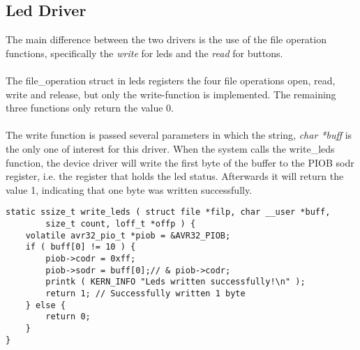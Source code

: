 \subsection{Led Driver}
The main difference between the two drivers is the use of the file operation
functions, specifically the \textit{write} for leds and the \textit{read} for
buttons.\\
\\
The file\_operation struct in leds registers the four file operations open,
read, write and release, but only the write-function is implemented.
The remaining three functions only return the value 0.\\
\\
The write function is passed several parameters in which the string,
\textit{char *buff} is the only one of interest for this driver.
When the system calls the write\_leds function, the device driver will 
write the first byte of the buffer to the PIOB sodr register, i.e. the register
that holds the led status. Afterwards it will return the value 1, indicating that
one byte was written successfully.
\\
\begin{lstlisting}
static ssize_t write_leds ( struct file *filp, char __user *buff, 
		size_t count, loff_t *offp ) {
	volatile avr32_pio_t *piob = &AVR32_PIOB;
	if ( buff[0] != 10 ) {
		piob->codr = 0xff;
		piob->sodr = buff[0];// & piob->codr;
		printk ( KERN_INFO "Leds written successfully!\n" );
		return 1; // Successfully written 1 byte
	} else {
		return 0;
	}
}
\end{lstlisting}